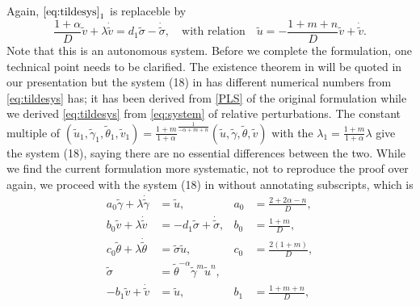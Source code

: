 \documentclass[a4paper,11pt]{article}
\def\tg{{\tilde{\gamma}}}
\def\tv{{\tilde{v}}}
\def\tth{{\tilde{\theta}}}
\def\ts{{\tilde{\sigma}}}
\def\tu{{\tilde{u}}}
\def\dtg{{\dot{\tilde{\gamma}}}}
\def\dtv{{\dot{\tilde{v}}}}
\def\dtth{{\dot{\tilde{\theta}}}}
\def\dts{{\dot{\tilde{\sigma}}}}
\theoremstyle{remark}
\begin{document}
Again, $\eqref{eq:tildesys}_1$ is replaceble by
$$\frac{1+ \alpha}{D} \tv + \lambda \dot\tv = d_1 \ts -\dot\ts, \quad \text{with relation} \quad \tu = -\frac{1+m+n}{D}\tv + \dot\tv.$$
Note that this is an autonomous system. Before we complete the formulation, one technical point needs to be clarified. The existence theorem in \cite{KLT17} will be quoted in our presentation but the system (18) in \cite{KLT17} has different numerical numbers from \eqref{eq:tildesys} has; it has been derived from \eqref{PLS} of the original formulation while we derived \eqref{eq:tildesys} from \eqref{eq:system} of relative perturbations. The constant multiple of $(\tu_1,\tg_1,\tth_1,\tv_1)=\frac{1+m}{1+\alpha}^{\frac{1}{-\alpha+m+n}}(\tu,\tg,\tth,\tv)$ with the $\lambda_1 =\frac{1+m}{1+\alpha}\lambda$ give the system (18), saying there are no essential differences between the two. While we find the current formulation more systematic, not to reproduce the proof over again, we proceed with the system (18) in \cite{KLT17} without annotating subscripts, which is 
\begin{equation} \label{eq:tildesys}
 \begin{aligned}
  a_0\tg + \lambda\dtg &=\tu, & a_0&=\frac{2+2\alpha-n}{D},\\
  b_0\tv + \lambda\dtv &=-d_1 \ts + \dts,& b_0&=\frac{1+m}{D},\\
  c_0\tth+ \lambda\dtth&=\ts\tu, & c_0&=\frac{2(1+m)}{D},\\
  \ts &=\tth^{-\alpha}\tg^m\tu^n, \\
  -b_1\tv+\dtv &= \tu, & b_1&=\frac{1+m+n}{D},
 \end{aligned}
\end{equation}
\end{document}
